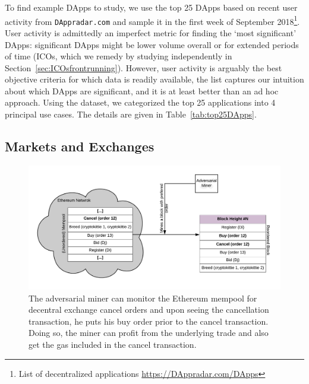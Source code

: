To find example DApps to study, we use the top 25 DApps based on recent user activity from \texttt{DAppradar.com} and sample it in the first week of September 2018\footnote{List of decentralized applications \url{https://DAppradar.com/DApps}}. User activity is admittedly an imperfect metric for finding the `most significant' DApps: significant DApps might be lower volume overall or for extended periods of time (\eg ICOs, which we remedy by studying independently in Section~\ref{sec:ICOsfrontrunning}). However, user activity is arguably the best objective criteria for which data is readily available, the list captures our intuition about which DApps are significant, and it is at least better than an ad hoc approach. Using the dataset, we categorized the top 25 applications into 4 principal use cases. The details are given in Table~\ref{tab:top25DApps}.


\subsection{Markets and Exchanges} \label{sec:frontrunningExchanges}


\begin{figure}[t]
\centering
\includegraphics[width=0.7\linewidth]{figures/Miner_reorder_frontrun.png}
\caption{ The adversarial miner can monitor the Ethereum mempool for decentral exchange cancel orders and upon seeing the cancellation transaction, he puts his buy order prior to the cancel transaction. Doing so, the miner can profit from the underlying trade and also get the gas included in the cancel transaction. \label{fig:MinerFrontrunning}}
\end{figure}

